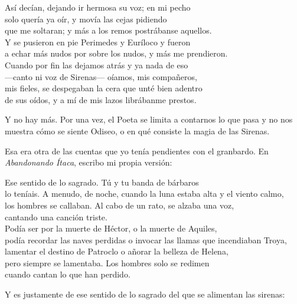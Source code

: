 \begin{versocita}
Así decían, dejando ir hermosa su voz; en mi pecho\\
solo quería ya oír, y movía las cejas pidiendo\\
que me soltaran; y más a los remos postrábanse aquellos.\\
Y se pusieron en pie Perimedes y Euríloco y fueron\\
a echar más nudos por sobre los nudos, y más me prendieron.\\
Cuando por fin las dejamos atrás y ya nada de eso\\
---canto ni voz de Sirenas--- oíamos, mis compañeros,\\
mis fieles, se despegaban la cera que unté bien adentro\\
de sus oídos, y a mí de mis lazos librábanme prestos.
\end{versocita}

Y no hay más. Por una vez, el Poeta se limita a contarnos lo que pasa y no nos muestra cómo se siente Odiseo, o en qué consiste la magia de las Sirenas.

Esa era otra de las cuentas que yo tenía pendientes con el granbardo. En \emph{Abandonando Ítaca}, escribo mi propia versión:

\begin{versopropio}
Ese sentido de lo sagrado. Tú y tu banda de bárbaros\\
lo teníais. A menudo, de noche, cuando la luna estaba alta y el viento calmo,\\
los hombres se callaban. Al cabo de un rato, se alzaba una voz,\\
cantando una canción triste.\\
Podía ser por la muerte de Héctor, o la muerte de Aquiles,\\
podía recordar las naves perdidas o invocar las llamas que incendiaban Troya,\\
lamentar el destino de Patroclo o añorar la belleza de Helena,\\
pero siempre se lamentaba. Los hombres solo se redimen\\
cuando cantan lo que han perdido.
\end{versopropio}

Y es justamente de ese sentido de lo sagrado del que se alimentan las sirenas:

